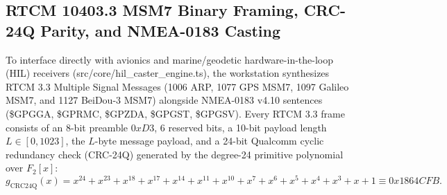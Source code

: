 \documentclass[11pt,a4paper,reqno]{article}
\def\texttt#1{#1}%
\def\mathbb#1{#1}%
\def\path#1{#1}%
\theoremstyle{plain}
\theoremstyle{definition}
\theoremstyle{remark}
\numberwithin{equation}{section}
\begin{document}
\subsection{RTCM 10403.3 MSM7 Binary Framing, CRC-24Q Parity, and NMEA-0183 Casting}
To interface directly with avionics and marine/geodetic hardware-in-the-loop (HIL) receivers (\path{src/core/hil_caster_engine.ts}), the workstation synthesizes RTCM 3.3 Multiple Signal Messages (\texttt{1006} ARP, \texttt{1077} GPS MSM7, \texttt{1097} Galileo MSM7, and \texttt{1127} BeiDou-3 MSM7) alongside NMEA-0183 v4.10 sentences (\texttt{\$GPGGA}, \texttt{\$GPRMC}, \texttt{\$GPZDA}, \texttt{\$GPGST}, \texttt{\$GPGSV}). Every RTCM 3.3 frame consists of an 8-bit preamble $\texttt{0xD3}$, 6 reserved bits, a 10-bit payload length $L \in [0, 1023]$, the $L$-byte message payload, and a 24-bit Qualcomm cyclic redundancy check (\texttt{CRC-24Q}) generated by the degree-24 primitive polynomial over $\mathbb{F}_2[x]$:
\begin{equation}
  g_{\text{CRC24Q}}(x) = x^{24} + x^{23} + x^{18} + x^{17} + x^{14} + x^{11} + x^{10} + x^7 + x^6 + x^5 + x^4 + x^3 + x + 1 \equiv \texttt{0x1864CFB}.
  \label{eq:crc24q_poly}
\end{equation}
\end{document}
